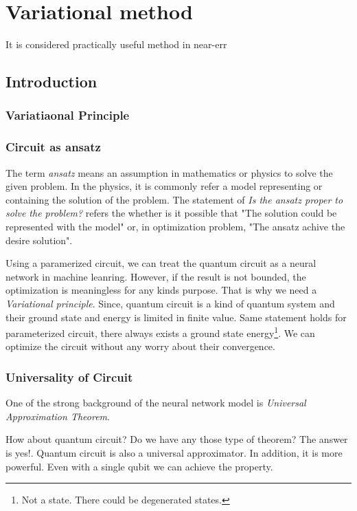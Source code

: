 \chapter{Variational method}

It is considered practically useful method in
near-err
\section{Introduction}

\subsection{Variatiaonal Principle}

\subsection{Circuit as ansatz}

The term \textit{ansatz} means an assumption 
in mathematics or physics to solve the given problem.
In the physics, it is commonly refer a model representing 
or containing the solution of the problem.
The statement of \textit{Is the ansatz proper to solve the problem?}
refers the whether is it possible that "The solution could be represented with the model"
or, in optimization problem, "The ansatz achive the desire solution".

Using a paramerized circuit, we can treat the quantum circuit 
as a neural network in machine leanring. 
However, if the result is not bounded, 
the optimization is meaningless for any kinds purpose.
That is why we need a \textit{Variational principle}.
Since, quantum circuit is a kind of quantum system and their
ground state and energy is limited in finite value.
Same statement holds for parameterized circuit, there always 
exists a ground state energy\footnote{Not a state. There could be degenerated states.}.
We can optimize the circuit without any worry about their convergence.

\subsection{Universality of Circuit}

One of the strong background of the neural network model is 
\textit{Universal Approximation Theorem}. 

How about quantum circuit? Do we have any those type of theorem?
The answer is yes!. Quantum circuit is also a universal approximator.
In addition, it is more powerful. Even with a single qubit we can achieve the property\cite{PhysRevA.104.012405-Universal-approxi}.

